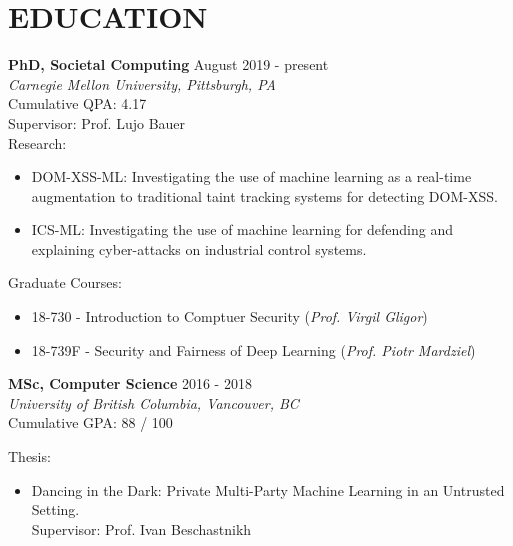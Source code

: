 \documentclass[10pt]{res} %
\begin{document}

\section{EDUCATION} 

\vspace{0.2in} %


\textbf {PhD, Societal Computing} \hfill August 2019 - present \\ 
{\sl Carnegie Mellon University, Pittsburgh, PA} \\
Cumulative QPA: 4.17 \\
Supervisor: Prof. Lujo Bauer \\

Research:
\begin{itemize}   
    \item DOM-XSS-ML: Investigating the use of machine learning as a real-time augmentation to traditional taint tracking systems for detecting DOM-XSS.
    \item ICS-ML: Investigating the use of machine learning for defending and explaining cyber-attacks on industrial control systems.
\end{itemize}

Graduate Courses:
\begin{itemize} 
    \item 18-730 - Introduction to Comptuer Security (\emph{Prof. Virgil Gligor})
    \item 18-739F - Security and Fairness of Deep Learning (\emph{Prof. Piotr Mardziel})
\end{itemize}


\textbf {MSc, Computer Science} \hfill 2016 - 2018 \\ 
{\sl University of British Columbia, Vancouver, BC} \\
Cumulative GPA: 88 / 100

Thesis:
\begin{itemize} 
    \item Dancing in the Dark: Private Multi-Party Machine Learning in an Untrusted Setting. \\
    Supervisor: Prof. Ivan Beschastnikh
\end{itemize}
\end{document}
